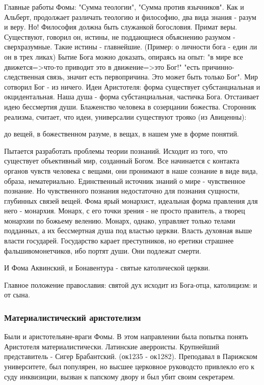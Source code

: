 Главные работы Фомы: "Сумма теологии", "Сумма против язычников". Как и Альберт, продолжает различать теологию и философию, два вида знания - разум и веру. Но! Философия должна быть служанкой богословия. Примат веры. Существуют, говорил он, истины, не поддающиеся объяснению разумом - сверхразумные. Такие истины - главнейшие. (Пример: о личности бога - един ли он в трех ликах) Бытие Бога можно доказать, опираясь на опыт: "в мире все движется=>что-то приводит это в движение=>это Бог!" "есть причинно-следственная связь, значит есть первопричина. Это может быть только Бог". Мир сотворил Бог - из ничего. Идеи Аристотеля: форма существует субстанциальная и окцидентальная. Наша душа - форма субстанциальная, частичка Бога. Отстаивает идею бессмертия души. Блаженство человека в созерцании божества. Сторонник реализма, считает, что идеи, универсалии существуют трояко (из Авиценны):

    до вещей, в божественном разуме,
    в вещах,
    в нашем уме в форме понятий.

Пытается разработать проблемы теории познаний. Исходит из того, что существует объективный мир, созданный Богом. Все начинается с контакта органов чувств человека с вещами, они пронимают в наше сознание в виде вида, образа, нематериально. Единственный источник знаний о мире - чувственное познание. Но чувственного познания недостаточно для познания сущности, глубинных связей вещей. Фома ярый монархист, идеальная форма правления для него - монархия. Монарх, с его точки зрения - не просто правитель, а творец монархии по божьему велению. Монарх, однако, управляет только телами подданных, а их бессмертная душа под властью церкви. Власть духовная выше власти государей. Государство карает преступников, но еретики страшнее фальшивомонетчиков, ибо портят души. Они подлежат смерти.

И Фома Аквинский, и Бонавентура - святые католической церкви.

Главное положение православия: святой дух исходит из Бога-отца, католицизм: и от сына.
\subsubsection{Материалистический аристотелизм}

Были и аристотельяне-враги Фомы. В этом направлении была попытка понять Аристотеля материалистически. Латинские аверроисты. Крупнейший представитель - Сигер Брабантский. (ок1235 - ок1282). Преподавал в Парижском университете, был популярен, но высшее церковное руководсто привлекло его к суду инквизиции, вызван к папскому двору и был убит своим секретарем.


